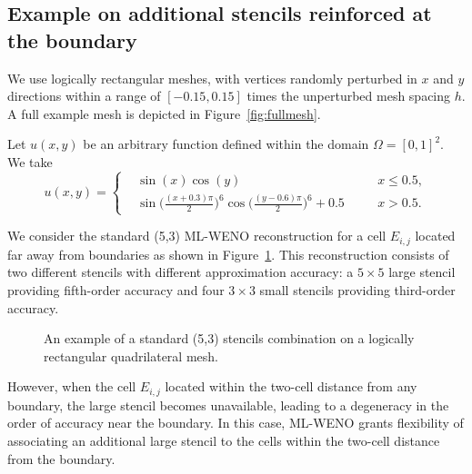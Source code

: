 
\subsection{Example on additional stencils reinforced at the boundary}

We use logically rectangular meshes, with vertices randomly perturbed in $x$ and $y$
directions within
a range of $[-0.15,0.15]$ times the unperturbed mesh spacing $h$.
A full example mesh is depicted in Figure~\ref{fig:fullmesh}.

Let $u(x,y)$ be an arbitrary function defined within the domain $\Omega = [0,1]^2$. We take
\begin{equation}
u(x,y) = \left \{ 
		  \begin{alignedat}{2}
		  &\sin(x) \cos(y)  \quad && x\leq 0.5,\\
		  &\sin\bigg(\frac{(x+0.3)\pi}{2}\bigg)^6 \cos\bigg(\frac{(y-0.6)\pi}{2}\bigg)^6 + 0.5  \quad && x>0.5.
		  \end{alignedat}
		  \right.
\end{equation}

We consider the standard (5,3) ML-WENO reconstruction for a cell $E_{i,j}$ located far away from boundaries
as shown in Figure~\ref{fig:53stencils}. 
This reconstruction consists of two different stencils with different approximation accuracy: 
a $5 \times 5$ large stencil providing fifth-order accuracy and four $3 \times 3$ small stencils providing
third-order accuracy. 
\begin{figure}[htb]
\centering

\caption{An example of a standard (5,3) stencils combination on a 
logically rectangular quadrilateral mesh.}
\label{fig:53stencils}
\end{figure}
However, when the cell $E_{i,j}$ located within the two-cell distance from any boundary, the large stencil 
becomes unavailable, leading to a degeneracy in the order of accuracy near the boundary. 
In this case, ML-WENO grants flexibility of associating an additional large stencil to the cells within 
the two-cell distance from the boundary.

